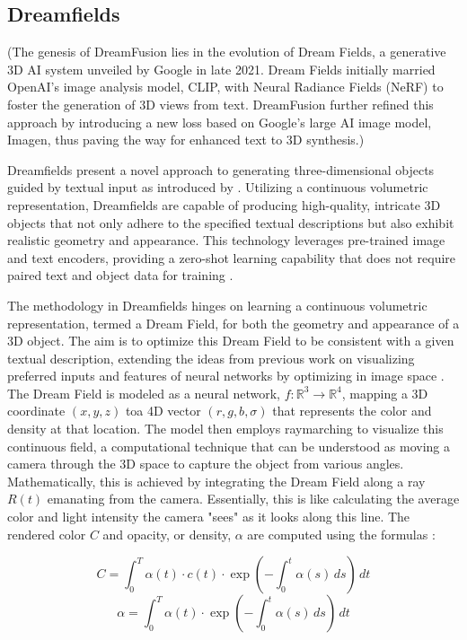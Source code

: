 \subsection{Dreamfields}
\label{dreamfields}


(The genesis of DreamFusion lies in the evolution of Dream Fields, a generative 3D AI system unveiled by Google in late 2021. Dream Fields initially married OpenAI's image analysis model, CLIP, with Neural Radiance Fields (NeRF) to foster the generation of 3D views from text. DreamFusion further refined this approach by introducing a new loss based on Google's large AI image model, Imagen, thus paving the way for enhanced text to 3D synthesis.)


Dreamfields present a novel approach to generating three-dimensional objects guided by textual input as introduced by \citeauthor{jainDreamFields}. Utilizing a continuous volumetric representation, Dreamfields are capable of producing high-quality, intricate 3D objects that not only adhere to the specified textual descriptions but also exhibit realistic geometry and appearance. This technology leverages pre-trained image and text encoders, providing a zero-shot learning capability that does not require paired text and object data for training \citep{jainDreamFields}.

The methodology in Dreamfields hinges on learning a continuous volumetric representation, termed a Dream Field, for both the geometry and appearance of a 3D object. The aim is to optimize this Dream Field to be consistent with a given textual description, extending the ideas from previous work on visualizing preferred inputs and features of neural networks by optimizing in image space \citep{jainDreamFields}. The Dream Field is modeled as a neural network, \( f: \mathbb{R}^3 \rightarrow \mathbb{R}^4 \), mapping a 3D coordinate \( (x, y, z) \) toa 4D vector \( (r, g, b, \sigma) \) that represents the color and density at that location. The model then employs raymarching to visualize this continuous field, a computational technique that can be understood as moving a camera through the 3D space to capture the object from various angles. Mathematically, this is achieved by integrating the Dream Field along a ray \( R(t) \) emanating from the camera. Essentially, this is like calculating the average color and light intensity the camera "sees" as it looks along this line. The rendered color \( C \) and opacity, or density, \( \alpha \) are computed using the formulas \citep{jainDreamFields}:

\[
C = \int_0^T \alpha(t) \cdot c(t) \cdot \exp\left(-\int_0^t \alpha(s) \, ds\right) \, dt
\]
\[
\alpha = \int_0^T \alpha(t) \cdot \exp\left(-\int_0^t \alpha(s) \, ds\right) \, dt
\]


